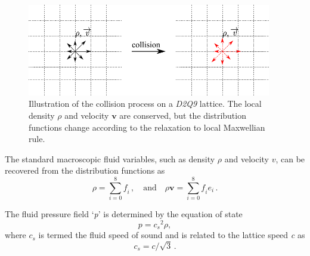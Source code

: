 \begin{figure}[htbp]
	\centering
	\includegraphics[width=0.95\textwidth]{collision}
	\caption[Illustration of the collision process on a \textit{D2Q9} 
	lattice.]{Illustration of the collision process on a \textit{D2Q9} lattice. 
	The local density $\rho$ and velocity $\mathbf{v}$ are conserved, but the 
	distribution functions change according to the relaxation to local 
	Maxwellian rule.}
	\label{fig:collision}
\end{figure} 

The standard macroscopic fluid variables, such as density $\rho$ and velocity 
$\mathbf{\mathit{ v}}$, can be recovered from the distribution functions as
%
\begin{equation}
	\rho = \sum\limits_{\mathit{i}=0}^{8}{\mathit{f_i}}\,, \quad \mbox{and} 
	\quad \rho \mathbf{v} 
	= \sum\limits_{\mathit{i}=0}^{8}{\mathit{f_i}}\mathbf{\mathit{e_i}}\,.
\end{equation}

The fluid pressure field `\textit{p}' is determined by the 
equation of state
%
\begin{equation}
	\mathit{p}=\mathit{c_s}^{2} \rho,
\end{equation}
%
\noindent where $\mathit{c_s}$ is termed the fluid speed of sound and is 
related to the lattice speed \textit{c} as
%
\begin{equation}
	\mathit{c_s}=\mathit{c}/\sqrt{3}\,.
\end{equation}

